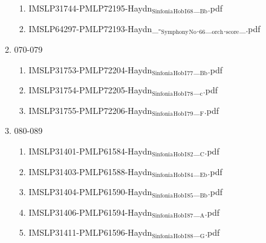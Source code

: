 \documentclass[11pt]{article}
\begin{document}
\begin{enumerate}
\begin{enumerate}
\begin{enumerate}
\item IMSLP31744-PMLP72195-Haydn$_{\text{Sinfonia}}$$_{\text{Hob}}$$_{\text{I}}$$_{\text{68}}$\_$_{\text{Bb}}$.pdf
\label{sec-1-1-1-1-44-38-7-7-9}

\item IMSLP64297-PMLP72193-Haydn\_-$_{\text{Symphony}}$$_{\text{No}}$.$_{\text{66}}$\_$_{\text{orch}}$.$_{\text{score}}$\_.pdf
\label{sec-1-1-1-1-44-38-7-7-10}
\end{enumerate}

\item 070-079
\label{sec-1-1-1-1-44-38-7-8}
\begin{enumerate}
\item IMSLP31753-PMLP72204-Haydn$_{\text{Sinfonia}}$$_{\text{Hob}}$$_{\text{I}}$$_{\text{77}}$\_$_{\text{Bb}}$.pdf
\label{sec-1-1-1-1-44-38-7-8-1}

\item IMSLP31754-PMLP72205-Haydn$_{\text{Sinfonia}}$$_{\text{Hob}}$$_{\text{I}}$$_{\text{78}}$\_$_{\text{c}}$.pdf
\label{sec-1-1-1-1-44-38-7-8-2}

\item IMSLP31755-PMLP72206-Haydn$_{\text{Sinfonia}}$$_{\text{Hob}}$$_{\text{I}}$$_{\text{79}}$\_$_{\text{F}}$.pdf
\label{sec-1-1-1-1-44-38-7-8-3}
\end{enumerate}

\item 080-089
\label{sec-1-1-1-1-44-38-7-9}
\begin{enumerate}
\item IMSLP31401-PMLP61584-Haydn$_{\text{Sinfonia}}$$_{\text{Hob}}$$_{\text{I}}$$_{\text{82}}$\_$_{\text{C}}$.pdf
\label{sec-1-1-1-1-44-38-7-9-1}

\item IMSLP31403-PMLP61588-Haydn$_{\text{Sinfonia}}$$_{\text{Hob}}$$_{\text{I}}$$_{\text{84}}$\_$_{\text{Eb}}$.pdf
\label{sec-1-1-1-1-44-38-7-9-2}

\item IMSLP31404-PMLP61590-Haydn$_{\text{Sinfonia}}$$_{\text{Hob}}$$_{\text{I}}$$_{\text{85}}$\_$_{\text{Bb}}$.pdf
\label{sec-1-1-1-1-44-38-7-9-3}

\item IMSLP31406-PMLP61594-Haydn$_{\text{Sinfonia}}$$_{\text{Hob}}$$_{\text{I}}$$_{\text{87}}$\_$_{\text{A}}$.pdf
\label{sec-1-1-1-1-44-38-7-9-4}

\item IMSLP31411-PMLP61596-Haydn$_{\text{Sinfonia}}$$_{\text{Hob}}$$_{\text{I}}$$_{\text{88}}$\_$_{\text{G}}$.pdf
\label{sec-1-1-1-1-44-38-7-9-5}


\end{enumerate}
\end{enumerate}
\end{enumerate}
\end{document}
